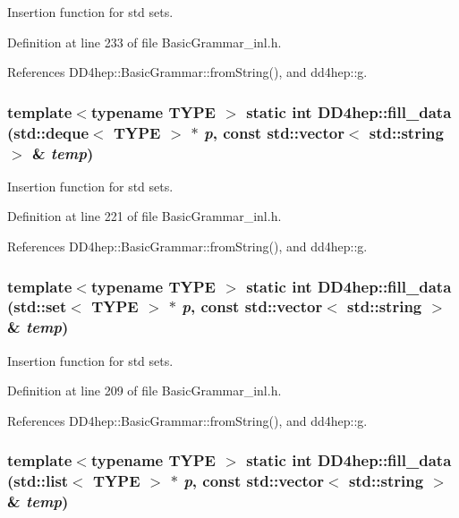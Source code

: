 Insertion function for std sets. 

Definition at line 233 of file BasicGrammar\_\-inl.h.

References DD4hep::BasicGrammar::fromString(), and dd4hep::g.\hypertarget{namespace_d_d4hep_a2a0db1e2f2b06848de850689dbf645dd}{
\subsubsection[{fill\_\-data}]{\setlength{\rightskip}{0pt plus 5cm}template$<$typename TYPE $>$ static int DD4hep::fill\_\-data (std::deque$<$ TYPE $>$ $\ast$ {\em p}, \/  const std::vector$<$ std::string $>$ \& {\em temp})}}
\label{namespace_d_d4hep_a2a0db1e2f2b06848de850689dbf645dd}


Insertion function for std sets. 

Definition at line 221 of file BasicGrammar\_\-inl.h.

References DD4hep::BasicGrammar::fromString(), and dd4hep::g.\hypertarget{namespace_d_d4hep_a9ed8efb5c13e504deabb405be4d47bd5}{
\subsubsection[{fill\_\-data}]{\setlength{\rightskip}{0pt plus 5cm}template$<$typename TYPE $>$ static int DD4hep::fill\_\-data (std::set$<$ TYPE $>$ $\ast$ {\em p}, \/  const std::vector$<$ std::string $>$ \& {\em temp})}}
\label{namespace_d_d4hep_a9ed8efb5c13e504deabb405be4d47bd5}


Insertion function for std sets. 

Definition at line 209 of file BasicGrammar\_\-inl.h.

References DD4hep::BasicGrammar::fromString(), and dd4hep::g.\hypertarget{namespace_d_d4hep_abe87bf16f830989b54dd85c6b4946b67}{
\subsubsection[{fill\_\-data}]{\setlength{\rightskip}{0pt plus 5cm}template$<$typename TYPE $>$ static int DD4hep::fill\_\-data (std::list$<$ TYPE $>$ $\ast$ {\em p}, \/  const std::vector$<$ std::string $>$ \& {\em temp})}}
\label{namespace_d_d4hep_abe87bf16f830989b54dd85c6b4946b67}


